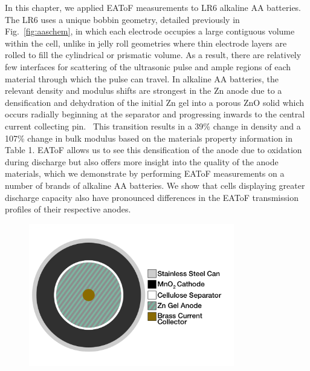 In this chapter, we applied EAToF measurements to LR6 alkaline AA batteries. The LR6 uses a unique bobbin geometry, detailed previously in Fig.~\ref{fig:aaschem}, in which each electrode occupies a large contiguous volume within the cell, unlike in jelly roll geometries where thin electrode layers are rolled to fill the cylindrical or prismatic volume. As a result, there are relatively few interfaces for scattering of the ultrasonic pulse and ample regions of each material through which the pulse can travel. In alkaline AA batteries, the relevant density and modulus shifts are strongest in the Zn anode due to a densification and dehydration of the initial Zn gel into a porous ZnO solid which occurs radially beginning at the separator and progressing inwards to the central current collecting pin.~\cite{Bhadra2015-aq} This transition results in a 39\% change in density and a 107\% change in bulk modulus based on the materials property information in Table 1. EAToF allows us to see this densification of the anode due to oxidation during discharge but also offers more insight into the quality of the anode materials, which we demonstrate by performing EAToF measurements on a number of brands of alkaline AA batteries. We show that cells displaying greater discharge capacity also have pronounced differences in the EAToF transmission profiles of their respective anodes.

\begin{figure}[htb]
  \centering
    \includegraphics[width=0.80\textwidth]{ch3-dbb/Images/aaschem.png}
\end{figure}

